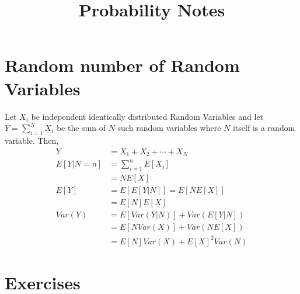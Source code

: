\documentclass[11pt, a4paper]{report}
\title{Probability Notes}
\begin{document}
    \maketitle{}
    \tableofcontents
    \cleardoublepage

    
    

    \chapter{Random number of Random Variables}
    Let $X_{i}$ be independent identically distributed Random Variables and let $Y = \sum_{i=1}^{N} X_{i}$ be the sum of $N$ such random variables where $N$ itself is a random variable. Then,
    \begin{align*}
        Y &= X_{1} + X_{2} + \cdots + X_{N}\\
        E[Y|N=n] &= \sum_{i=1}^{n}E[X_{i}]\\
                &= NE[X]\\
        E[Y] &= E[E[Y|N]] = E[NE[X]]\\
            &= E[N]E[X] \tag*{since $E[X]$ will be a number}\\
        Var(Y) &= E[Var(Y|N)] + Var(E[Y|N])\\
            &= E[NVar(X)] + Var(NE[X])\\
            &= E[N]Var(X) + E[X]^{2}Var(N)
    \end{align*}

    
    
    
    
    
    
    
    
    
    
    

    \chapter{Exercises}
    
    
\end{document}
